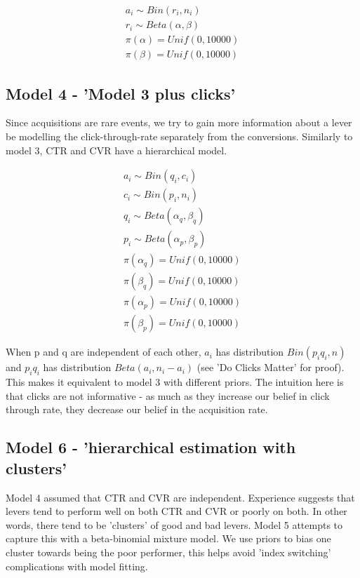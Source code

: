 \documentclass[12pt]{article}
\begin{document}
  \begin{align}
	a_i \sim Bin(r_i,n_i) \\
	r_i \sim Beta(\alpha,\beta) \\
	\pi(\alpha) = Unif(0,10000) \\
	\pi(\beta) = Unif(0,10000)
  \end{align}

\subsection{Model 4 - 'Model 3 plus clicks'} 
Since acquisitions are rare events, we try to gain more information about a lever be modelling the click-through-rate separately from the conversions. Similarly to model 3, CTR and CVR have a hierarchical model.

  \begin{align}
	a_i \sim Bin(q_i,c_i) \\
	c_i \sim Bin(p_i,n_i) \\
	q_i \sim Beta(\alpha_q,\beta_q) \\
	p_i \sim Beta(\alpha_p,\beta_p) \\
	\pi(\alpha_q) = Unif(0,10000) \\
	\pi(\beta_q) = Unif(0,10000) \\
	\pi(\alpha_p) = Unif(0,10000) \\
	\pi(\beta_p) = Unif(0,10000) 
  \end{align}

When p and q are independent of each other, $a_i$ has distribution $Bin(p_iq_i,n)$ and $p_iq_i$ has distribution $Beta(a_i,n_i - a_i)$ (see 'Do Clicks Matter' for proof). This makes it equivalent to model 3 with different priors. The intuition here is that clicks are not informative - as much as they increase our belief in click through rate, they decrease our belief in the acquisition rate.


\subsection{Model 6 - 'hierarchical estimation with clusters'}

Model 4 assumed that CTR and CVR are independent. Experience suggests that levers tend to perform well on both CTR and CVR or poorly on both. In other words, there tend to be 'clusters' of good and bad levers. Model 5 attempts to capture this with a beta-binomial mixture model. We use priors to bias one cluster towards being the poor performer, this helps avoid 'index switching' complications with model fitting. 
 
\end{document}
